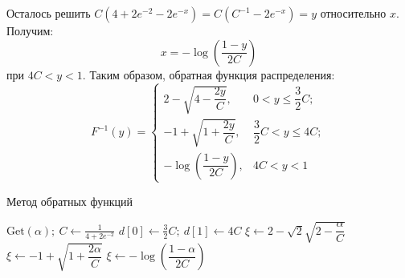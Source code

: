 \documentclass[specialist,
substylefile = spbu_report.rtx,
subf,href,colorlinks=true, 12pt]{disser}
\begin{document}
	Осталось решить $C(4+2e^{-2}-2e^{-x})=C(C^{-1}-2e^{-x})=y$ относительно $x$. Получим:
	\begin{equation*}
		x = -\log\left(\dfrac{1-y}{2C}\right)
	\end{equation*}
	при $4C<y<1$. Таким образом, обратная функция распределения:
	\begin{equation*}
		F^{-1}(y) =
		\begin{cases}
			2-\sqrt{4 - \dfrac{2y}{C}},&0<y\leqslant\dfrac{3}{2}C;\\
			-1+\sqrt{1+\dfrac{2y}{C}},&\dfrac{3}{2}C<y\leqslant4C;\\
			-\log\left(\dfrac{1-y}{2C}\right),&4C<y<1
		\end{cases}
	\end{equation*}
	\begin{algorithm}[h]
		\caption{Метод обратных функций}
	\begin{algorithmic}[1]
		\State $\mathrm{Get}(\alpha);~C\gets\frac{1}{4+2e^{-2}}$
		\State $d[0]\gets\frac{3}{2}C;~d[1]\gets4C$
			\State $\xi\gets2-\sqrt{2}\sqrt{2 - \dfrac{\alpha}{C}}$
			\State $\xi\gets-1+\sqrt{1+\dfrac{2\alpha}{C}}$
		\Else
			\State $\xi\gets-\log\left(\dfrac{1-\alpha}{2C}\right)$
		\EndIf
	\end{algorithmic}
	\end{algorithm}
\end{document}
